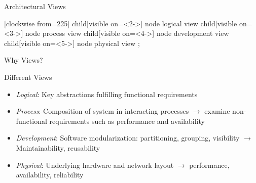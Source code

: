 \begin{frame}{Architectural Views \mytitlesource{\sommerville}}
	\begin{fancycolumns}[keep]
		{\tikz[grow cyclic,
				mindmap, every node/.style=concept,concept color=blue!20!background,
				level 1/.append style={level distance=27mm,sibling angle=360/4}]
			[clockwise from=225]
			child[visible on=<2->] { node {logical view} }
			child[visible on=<3->] { node {process view} }
			child[visible on=<4->] { node {development view} }
			child[visible on=<5->] { node {physical view} }
			;}
		\nextcolumn
		\begin{motivation}{Why Views? \mysource{\sommerville}}
			\small
		\end{motivation}
		\begin{definition}{Different Views }
			\small
			\begin{itemize}
				\item \emph{Logical}: Key abstractions fulfilling functional requirements
				\item \emph{Process}: Composition of system in interacting processes $\rightarrow$ examine non-functional requirements such as performance and availability
				\item \emph{Development}: Software modularization: partitioning, grouping, visibility $\rightarrow$ Maintainability, reusability
				\item \emph{Physical}: Underlying hardware and network layout $\rightarrow$ performance, availability, reliability
			\end{itemize}
		\end{definition}
	\end{fancycolumns}
\end{frame}